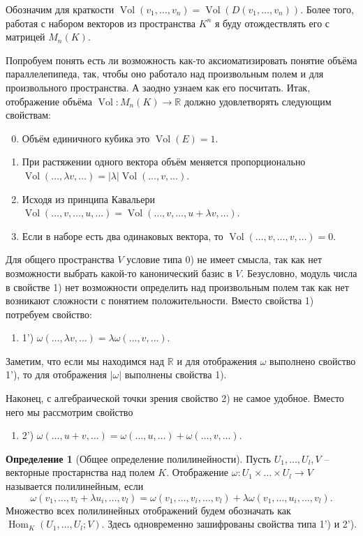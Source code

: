 \documentclass[10pt,a4paper,oneside]{book}
\theoremstyle{definition}
\newtheorem*{defn}{\color{yellow!30!red} Определение}
\newcommand{\mb}[1]{\mathbb{#1}}
\newcommand{\Vol}{\operatorname{Vol}}
\newcommand{\Hom}{\operatorname{Hom}}
\def\dfn{\begin{defn}}
\def\edfn{\end{defn}}
\def\enm{\begin{enumerate}}
\def\eenm{\end{enumerate}}
\begin{document}
Обозначим для краткости $\Vol(v_1,\dots,v_n)= \Vol (D(v_1,\dots,v_n))$. Более того, работая с набором векторов из пространства $K^n$ я буду отождествлять его с матрицей $M_n(K)$. 

Попробуем понять есть ли возможность как-то аксиоматизировать понятие объёма параллелепипеда, так, чтобы оно работало над произвольным полем и для произвольного пространства. А заодно узнаем как его посчитать. Итак, отображение объёма $\Vol \colon M_n(K) \to \mb R$ должно удовлетворять следующим свойствам:
\enm 
\setcounter{enumi}{-1}
\item Объём единичного кубика это $\Vol(E)=1$.
\item При растяжении одного вектора объём меняется пропорционально $\Vol(\dots,\lambda v,\dots)=|\lambda|\Vol(\dots,v,\dots)$.
\item Исходя из принципа Кавальери $\Vol(\dots,v,\dots,u,\dots)=\Vol(\dots,v,\dots,u+\lambda v,\dots)$.
\item Если в наборе есть два одинаковых вектора, то $\Vol(\dots,v, \dots, v,\dots)=0$.
\eenm

Для общего пространства $V$ условие типа 0) не имеет смысла, так как нет возможности выбрать какой-то канонический базис в $V$. Безусловно, модуль числа в свойстве 1) нет возможности определить над произвольным полем так как нет возникают сложности с понятием положительности. Вместо свойства 1) потребуем свойство:
\enm
\item[1')] $\omega(\dots,\lambda v,\dots)=\lambda \omega(\dots,v,\dots)$.
\eenm

Заметим, что если мы находимся над $\mb R$ и  для отображения $\omega$ выполнено свойство  1'), то для отображения $|\omega|$ выполнены свойства 1). 

Наконец, с алгебраической точки зрения свойство 2) не самое удобное. Вместо него мы рассмотрим свойство
\enm \item[2')] $\omega(\dots,u+v,\dots)=\omega(\dots,u,\dots)+\omega(\dots,v,\dots)$.
\eenm


\dfn[Общее определение полилинейности] Пусть $U_1,\dots,U_l, V$ -- векторные простарнства над полем $K$. Отображение $\omega \colon  U_1\times \dots \times U_l\to V $ называется полилинейным, если
$$\omega(v_1,\dots,v_i+\lambda u_i,\dots, v_l)= \omega(v_1,\dots,v_i,\dots, v_l)+\lambda\omega(v_1,\dots,u_i,\dots, v_l).$$
Множество всех полилинейных отображений будем обозначать как $\Hom_K(U_1,\dots,U_l;V)$. Здесь одновременно зашифрованы свойства типа 1')  и  2').
\edfn
\end{document}
